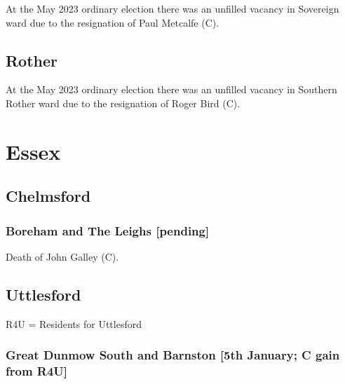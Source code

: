 \documentclass[a4paper,openany]{book}
\begin{document}
\begin{resultsiii}
At the May 2023 ordinary election there was an unfilled vacancy in Sovereign ward due to the resignation of Paul Metcalfe (C).%

\subsection*{Rother}

At the May 2023 ordinary election there was an unfilled vacancy in Southern Rother ward due to the resignation of Roger Bird (C).%

\section{Essex}

\subsection*{Chelmsford}

\subsubsection*{Boreham and The Leighs \hspace*{\fill}\nolinebreak[1]%
	\enspace\hspace*{\fill}
	[pending]}


Death of John Galley (C).

\subsection*{Uttlesford}

R4U = Residents for Uttlesford

\subsubsection*{Great Dunmow South and Barnston \hspace*{\fill}\nolinebreak[1]%
	\enspace\hspace*{\fill}
	[5th January; C gain from R4U]}



\end{resultsiii}
\end{document}

